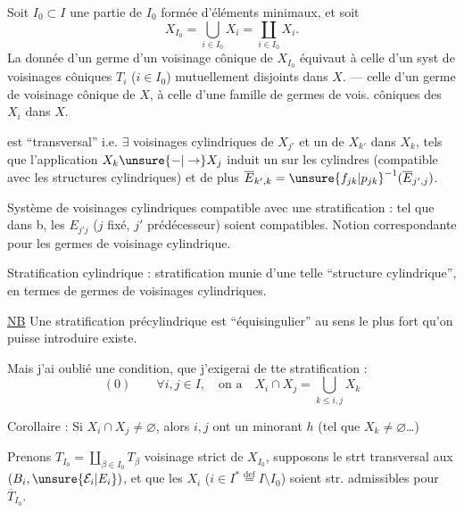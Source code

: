 Soit $I_0\subset I$ une partie de $I_0$ formée
d'éléments minimaux,  et soit
\[
X_{I_0}=\bigcup_{i\in I_0}X_i=\coprod_{i\in I_0}X_i.
\]
La donnée d'un germe 
d'un voisinage cônique  de $X_{I_0}$ équivaut à
celle d'un syst de voisinages côniques
$T_i$ ($i\in I_0$) mutuellement disjoints dans $X$. ---
celle d'un germe de voisinage cônique de $X$,
à celle d'une famille de germes de vois.
côniques des $X_i$ dans $X$.

est ``transversal'' i.e.  $\exists$ voisinages cylindriques
de $X_{j'}$  et un de $X_{k'}$ dans $X_k$, tels que l'application
$X_k\unsure{-|\to}X_j$ induit un  sur les
cylindres (compatible avec les structures
cylindriques) et de plus
$\overline E_{k',k}=\unsure{f_{jk}|p_{jk}}^{-1}(\overline E_{j',j})$.

Système de voisinages cylindriques 
compatible avec une stratification : tel que
dans b, les $E_{j'j}$ ($j$ fixé, $j'$ prédécesseur)
soient compatibles. Notion correspondante
pour les germes de voisinage cylindrique.

Stratification cylindrique : stratification munie
d'une telle ``structure cylindrique'', en
termes de germes de voisinages cylindriques.

\uline{NB} Une stratification précylindrique 
est 
``équisingulier'' au sens le plus fort qu'on
puisse introduire  existe.

Mais j'ai oublié une condition, que j'exigerai
de tte stratification :
\[
(0)\qquad \forall i,j\in I,\quad\text{on a}\quad
X_i\cap X_j=\bigcup_{k\le i,j}X_k
\]

Corollaire : Si $X_i\cap X_j\ne\varnothing$, alors $i,j$ ont un
minorant $h$ (tel que  $X_k\ne\varnothing$\ldots)

Prenons $T_{I_0}=\coprod_{\beta\in I_0}T_\beta$ voisinage
 strict
de $X_{I_0}$, supposons le strt transversal aux
$(B_i,\unsure{\mathcal E_i|E_i})$, et  que les $X_i$
($i\in I^*\overset{\mathrm{def}}=I\setminus I_0$)
soient str. admissibles pour $\overline T_{I_0}$.


